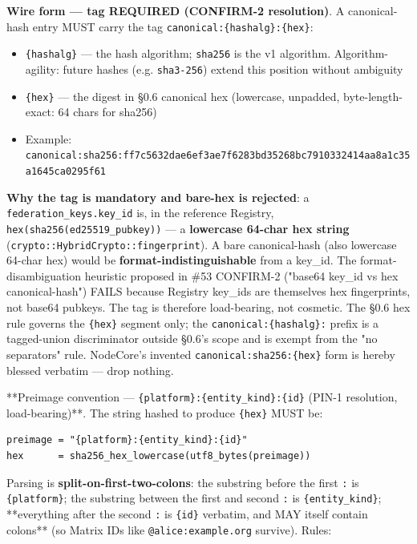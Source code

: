 \documentclass[11pt]{article}
\begin{document}
\textbf{Wire form — tag REQUIRED (CONFIRM-2 resolution)}. A canonical-hash entry MUST carry the tag \texttt{canonical:\{hashalg\}:\{hex\}}:


\begin{itemize}\setlength\itemsep{0pt}
\item \texttt{\{hashalg\}} — the hash algorithm; \texttt{sha256} is the v1 algorithm. Algorithm-agility: future hashes (e.g. \texttt{sha3-256}) extend this position without ambiguity
\item \texttt{\{hex\}} — the digest in §0.6 canonical hex (lowercase, unpadded, byte-length-exact: 64 chars for sha256)
\item Example: \texttt{canonical:sha256:ff7c5632dae6ef3ae7f6283bd35268bc7910332414aa8a1c35a1645ca0295f61}
\end{itemize}


\textbf{Why the tag is mandatory and bare-hex is rejected}: a \texttt{federation\_keys.key\_id} is, in the reference Registry, \texttt{hex(sha256(ed25519\_pubkey))} — a \textbf{lowercase 64-char hex string} (\texttt{crypto::HybridCrypto::fingerprint}). A bare canonical-hash (also lowercase 64-char hex) would be \textbf{format-indistinguishable} from a key\_id. The format-disambiguation heuristic proposed in \#53 CONFIRM-2 ("base64 key\_id vs hex canonical-hash") FAILS because Registry key\_ids are themselves hex fingerprints, not base64 pubkeys. The tag is therefore load-bearing, not cosmetic. The §0.6 hex rule governs the \texttt{\{hex\}} segment only; the \texttt{canonical:\{hashalg\}:} prefix is a tagged-union discriminator outside §0.6's scope and is exempt from the "no separators" rule. NodeCore's invented \texttt{canonical:sha256:\{hex\}} form is hereby blessed verbatim — drop nothing.


**Preimage convention — \texttt{\{platform\}:\{entity\_kind\}:\{id\}} (PIN-1 resolution, load-bearing)**. The string hashed to produce \texttt{\{hex\}} MUST be:


\begin{lstlisting}
preimage = "{platform}:{entity_kind}:{id}"
hex      = sha256_hex_lowercase(utf8_bytes(preimage))
\end{lstlisting}

Parsing is \textbf{split-on-first-two-colons}: the substring before the first \texttt{:} is \texttt{\{platform\}}; the substring between the first and second \texttt{:} is \texttt{\{entity\_kind\}}; **everything after the second \texttt{:} is \texttt{\{id\}} verbatim, and MAY itself contain colons** (so Matrix IDs like \texttt{@alice:example.org} survive). Rules:
\end{document}
